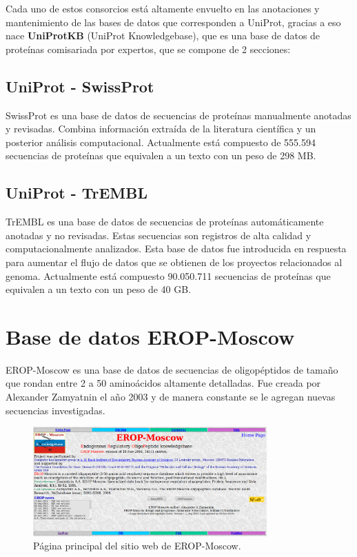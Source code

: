 Cada uno de estos consorcios está altamente envuelto en las anotaciones y mantenimiento de las bases de datos que corresponden a UniProt, gracias a eso nace \textbf{UniProtKB} (UniProt Knowledgebase), que es una base de datos de proteínas comisariada por expertos, que se compone de 2 secciones:

\subsection{UniProt - SwissProt}

SwissProt es una base de datos de secuencias de proteínas manualmente anotadas y revisadas. Combina información extraída de la literatura científica y un posterior análisis computacional. Actualmente está compuesto de 555.594 secuencias de proteínas que equivalen a un texto con un peso de 298 MB.

\subsection{UniProt - TrEMBL}

TrEMBL es una base de datos de secuencias de proteínas automáticamente anotadas y no revisadas. Estas secuencias son registros de alta calidad y computacionalmente analizados. Esta base de datos fue introducida en respuesta para aumentar el flujo de datos que se obtienen de los proyectos relacionados al genoma. Actualmente está compuesto 90.050.711 secuencias de proteínas que equivalen a un texto con un peso de 40 GB.

\section{Base de datos EROP-Moscow}

EROP-Moscow es una base de datos de secuencias de oligopéptidos de tamaño que rondan entre 2 a 50 aminoácidos altamente detalladas. Fue creada por Alexander Zamyatnin el año 2003 y de manera constante se le agregan nuevas secuencias investigadas.

\begin{figure}[h]
    \centering
    \includegraphics[width=0.8\textwidth]{./images/eropmoscow_main.png}
    \caption{Página principal del sitio web de EROP-Moscow.}
    \label{fig:image8}
\end{figure}

